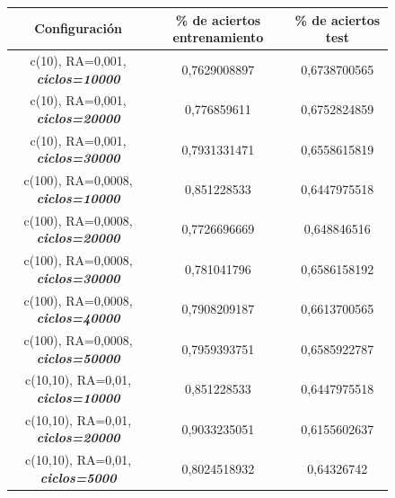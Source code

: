 \documentclass{uc3mpracticas}
\begin{document}
\begin{figure}[!h]
\begin{center}
  \begin{tabular}{|c|c|c|}
    \hline
    \rowcolor{Gray}
        \textbf{Configuración}                                            & \textbf{\% de aciertos entrenamiento} & \textbf{\% de aciertos test}\\ \hline \hline
        c(10), RA=0,001, \textit{\textbf{ciclos=10000}}                   &  0,7629008897                         &  0,6738700565     \\ \hline
        \rowcolor{LightCyan}
        c(10), RA=0,001, \textit{\textbf{ciclos=20000}}                   &  0,776859611                          &  0,6752824859     \\ \hline
        c(10), RA=0,001, \textit{\textbf{ciclos=30000}}                   &  0,7931331471                         &  0,6558615819     \\ \hline \hline \hline

        c(100), RA=0,0008, \textit{\textbf{ciclos=10000}}                 &  0,851228533                          &  0,6447975518     \\ \hline
        c(100), RA=0,0008, \textit{\textbf{ciclos=20000}}                 &  0,7726696669                         &  0,648846516      \\ \hline
        c(100), RA=0,0008, \textit{\textbf{ciclos=30000}}                 &  0,781041796                          &  0,6586158192     \\ \hline
        \rowcolor{LightCyan}
        c(100), RA=0,0008, \textit{\textbf{ciclos=40000}}                 &  0,7908209187                         &  0,6613700565     \\ \hline
        c(100), RA=0,0008, \textit{\textbf{ciclos=50000}}                 &  0,7959393751                         &  0,6585922787     \\ \hline \hline \hline

        \rowcolor{LightCyan}
        c(10,10), RA=0,01, \textit{\textbf{ciclos=10000}}                 &  0,851228533                          &  0,6447975518     \\ \hline
        c(10,10), RA=0,01, \textit{\textbf{ciclos=20000}}                 &  0,9033235051                         &  0,6155602637     \\ \hline
        c(10,10), RA=0,01, \textit{\textbf{ciclos=5000}}                  &  0,8024518932                         &  0,64326742       \\ \hline \hline \hline


\end{tabular}
\end{center}
\end{figure}
\end{document}
